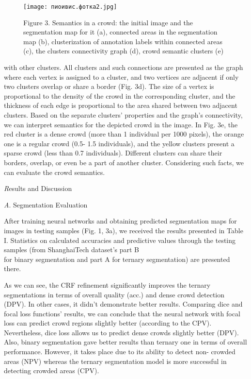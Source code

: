\documentclass{article}
\begin{document}
\newpage
\begin{figure}
\setcounter{figure}{1}
    \centering
   
\texttt{[image: пиоивис.фотка2.jpg]}
\caption{ \small Figure 3. Semantics in a crowd: the initial image and the segmentation map for it (a), connected areas in the segmentation map (b), clusterization of annotation labels within connected areas (c), the clusters connectivity graph (d), crowd semantic clusters (e)
}
 \end{figure}
  \begin{multicols}{2}
  with other clusters. All clusters and such connections are
presented as the graph where each vertex is assigned
to a cluster, and two vertices are adjacent if only two
clusters overlap or share a border (Fig. 3d). The size of
a vertex is proportional to the density of the crowd in
the corresponding cluster, and the thickness of each edge
is proportional to the area shared between two adjacent
clusters. Based on the separate clusters’ properties and
the graph’s connectivity, we can interpret semantics for
the depicted crowd in the image. In Fig. 3e, the red
cluster is a dense crowd (more than 1 individual per
1000 pixels), the orange one is a regular crowd (0.5-
1.5 individuals), and the yellow clusters present a sparse
crowd (less than 0.7 individuals). Different clusters can
share their borders, overlap, or even be a part of another
cluster. Considering such facts, we can evaluate the
crowd semantics.
\par
\begin{centering}
\vspace{2mm}
 \uppercase\expandafter{}  %
\textit Results and Discussion
\par
\vspace{3mm}
\textit A. Segmentation Evaluation
\end{centering}
\par
\vspace{2mm}
After training neural networks and obtaining predicted
segmentation maps for images in testing samples (Fig. 1,
3a), we received the results presented in Table I. Statistics
on calculated accuracies and predictive values through
the testing samples (from ShanghaiTech dataset’s part B 
\\
for binary segmentation and part A for ternary segmentation) are presented there.

\vspace{2mm}
As we can see, the CRF refinement significantly
improves the ternary segmentations in terms of overall
quality (acc.) and dense crowd detection (DPV). In other
cases, it didn’t demonstrate better results. Comparing
dice and focal loss functions’ results, we can conclude
that the neural network with focal loss can predict crowd
regions slightly better (according to the CPV). Nevertheless, dice loss allows us to predict dense crowds slightly
better (DPV). Also, binary segmentation gave better
results than ternary one in terms of overall performance.
However, it takes place due to its ability to detect non-
crowded areas (NPV) whereas the ternary segmentation
model is more successful in detecting crowded areas
(CPV).


\end{multicols}
\end{document}
